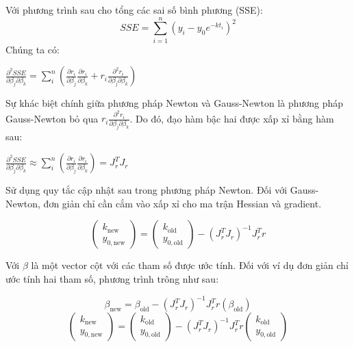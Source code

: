 \documentclass[conference]{IEEEtran}
\begin{document}
Với phương trình sau cho tổng các sai số bình phương (SSE):
\[
    SSE = \sum_{i=1}^{n} (y_i - y_0 e^{-kt_i})^2
\]
Chúng ta có:
\begin{center}
    \(
    \frac{\partial^2 {SSE}}{\partial \beta_j \partial \beta_k} = \sum_{i}^{n} \left( \frac{\partial r_i}{\partial \beta_j} \frac{\partial r_i}{\partial \beta_k} + r_i \frac{\partial^2 r_i}{\partial \beta_j \partial \beta_k} \right)
    \)
\end{center}

Sự khác biệt chính giữa phương pháp Newton và Gauss-Newton là phương pháp Gauss-Newton bỏ qua \(r_i \frac{\partial^2 r_i}{\partial \beta_j \partial \beta_k}\).
Do đó, đạo hàm bậc hai được xấp xỉ bằng hàm sau:
\begin{center}
    \(
    \frac{\partial^2 {SSE}}{\partial \beta_j \partial \beta_k} \approx \sum_{i}^{n} \left( \frac{\partial r_i}{\partial \beta_j} \frac{\partial r_i}{\partial \beta_k} \right) = J^T_r J_r
    \)
\end{center}

Sử dụng quy tắc cập nhật sau trong phương pháp Newton. Đối với Gauss-Newton, đơn giản chỉ cần cắm vào xấp xỉ cho ma trận Hessian và gradient.

\begin{center}
    \[
        \begin{pmatrix}
            k_{\text{new}} \\ y_{0,\text{new}}
        \end{pmatrix} =
        \begin{pmatrix}
            k_{\text{old}} \\ y_{0,\text{old}}
        \end{pmatrix} - (J^T_r J_r)^{-1} J^T_r r
    \]
\end{center}

Với \(\beta\) là một vector cột với các tham số được ước tính. Đối với ví dụ đơn giản chỉ ước tính hai tham số, phương trình trông như sau:

\begin{center}
    \[
        \beta_{\text{new}} = \beta_{\text{old}} - (J^T_r J_r)^{-1} J^T_r r(\beta_{\text{old}})
    \]
    \[
        \begin{pmatrix}
            k_{\text{new}} \\ y_{0,\text{new}}
        \end{pmatrix} =
        \begin{pmatrix}
            k_{\text{old}} \\ y_{0,\text{old}}
        \end{pmatrix} - (J^T_r J_r)^{-1} J^T_r r \begin{pmatrix}
            k_{\text{old}} \\ y_{0,\text{old}}
        \end{pmatrix}
    \]
\end{center}
\vspace{3mm}
\end{document}
